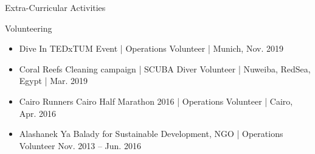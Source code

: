 \documentclass[]{mcdowellcv}
\begin{document}
	\begin{cvsection}{Extra-Curricular Activities}
		\begin{cvsubsection}{Volunteering}{}{}	
			
			\begin{itemize}
				\item Dive In TEDxTUM Event | Operations Volunteer | Munich, Nov. 2019
				\item Coral Reefs Cleaning campaign | SCUBA Diver Volunteer | Nuweiba, RedSea, Egypt | Mar. 2019
				\item Cairo Runners Cairo Half Marathon 2016 | Operations Volunteer | Cairo, Apr. 2016
				\item Alashanek Ya Balady for Sustainable Development, NGO | Operations Volunteer  Nov. 2013 -- Jun. 2016
			\end{itemize}
		\end{cvsubsection}
	\end{cvsection}
	
	
\end{document}
